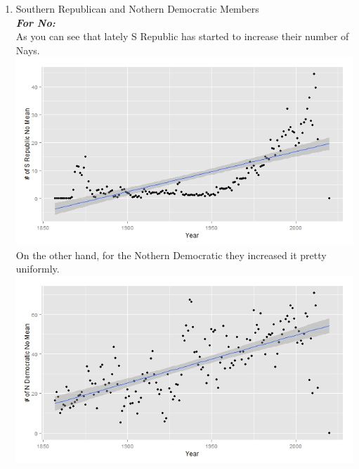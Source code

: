 \documentclass{article}
\begin{document}
\begin{enumerate}
	\item Southern Republican and Nothern Democratic Members \\
	\textbf{\emph{For No:}}\\
As you can see that lately S Republic has started to increase their number of Nays.\\
\includegraphics{SRepubNo} \\
 On the other hand, for the Nothern Democratic they increased it pretty uniformly.\\
\includegraphics{NorthDemNo} \\


\end{enumerate}
\end{document}
